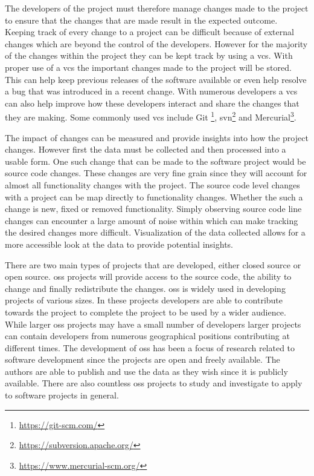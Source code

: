 The developers of the project must therefore manage changes made to the project to ensure that the changes that are made result in the expected outcome. Keeping track of every change to a project can be difficult because of external changes which are beyond the control of the developers. However for the majority of the changes within the project they can be kept track by using a \gls{vcs}. With proper use of a \gls{vcs} the important changes made to the project will be stored. This can help keep previous releases of the software available or even help resolve a bug that was introduced in a recent change. With numerous developers a \gls{vcs} can also help improve how these developers interact and share the changes that they are making. Some commonly used \gls{vcs} include Git \footnote{\url{https://git-scm.com/}}, \gls{svn}\footnote{\url{https://subversion.apache.org/}} and Mercurial\footnote{\url{https://www.mercurial-scm.org/}}.

The impact of changes can be measured and provide insights into how the project changes. However first the data must be collected and then processed into a usable form. One such change that can be made to the software project would be source code changes. These changes are very fine grain since they will account for almost all functionality changes with the project. The source code level changes with a project can be map directly to functionality changes. Whether the such a change is new, fixed or removed functionality. Simply observing source code line changes can encounter a large amount of noise within which can make tracking the desired changes more difficult. Visualization of the data collected allows for a more accessible look at the data to provide potential insights.



There are two main types of projects that are developed, either closed source or open source. \gls{oss} projects will provide access to the source code, the ability to change and finally redistribute the changes. \gls{oss} is widely used in developing projects of various sizes. In these projects developers are able to contribute towards the project to complete the project to be used by a wider audience. While larger \gls{oss} projects may have a small number of developers larger projects can contain developers from numerous geographical positions contributing at different times. The development of \gls{oss} has been a focus of research related to software development since the projects are open and freely available. The authors are able to publish and use the data as they wish since it is publicly available. There are also countless \gls{oss} projects to study and investigate to apply to software projects in general.

